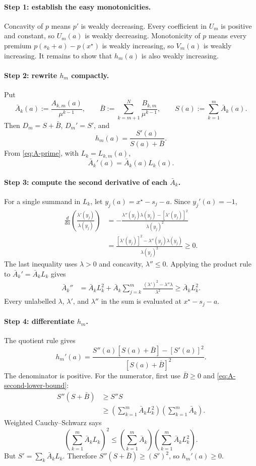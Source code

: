 \documentclass[11pt]{article}
\theoremstyle{tutorial}
\theoremstyle{remark}
\newcommand{\1}{\mathbb{I}}
\begin{document}
\paragraph{Step 1: establish the easy monotonicities.}
Concavity of $p$ means $p'$ is weakly decreasing.  Every coefficient in $U_m$ is positive and constant,
so $U_m(a)$ is weakly decreasing.  Monotonicity of $p$ means every premium
$p(s_k+a)-p(x^\star)$ is weakly increasing, so $V_m(a)$ is weakly increasing.  It remains to show that
$h_m(a)$ is also weakly increasing.

\paragraph{Step 2: rewrite $h_m$ compactly.}
Put
\[
\bar A_k(a):=\frac{A_{k,m}(a)}{\mu^{k-1}},
\qquad
\bar B:=\sum_{k=m+1}^N\frac{B_{k,m}}{\mu^{k-1}},
\qquad
S(a):=\sum_{k=1}^m\bar A_k(a).
\]
Then $D_m=S+\bar B$, $D_m'=S'$, and
\[
  h_m(a)=\frac{S'(a)}{S(a)+\bar B}.
\]
From \eqref{eq:A-prime}, with $L_k=L_{k,m}(a)$,
\[
  \bar A_k'(a)=\bar A_k(a)L_k(a).
\]

\paragraph{Step 3: compute the second derivative of each $\bar A_k$.}
For a single summand in $L_k$, let $y_j(a)=x^\star-s_j-a$.  Since $y_j'(a)=-1$,
\begin{align*}
\frac{d}{da}\left(\frac{\lambda'(y_j)}{\lambda(y_j)}\right)
&=-\frac{\lambda''(y_j)\lambda(y_j)-[\lambda'(y_j)]^2}{\lambda(y_j)^2}\\
&=\frac{[\lambda'(y_j)]^2-\lambda''(y_j)\lambda(y_j)}{\lambda(y_j)^2}\ge0.
\end{align*}
The last inequality uses $\lambda>0$ and concavity, $\lambda''\le0$.  Applying the product rule to
$\bar A_k'=\bar A_kL_k$ gives
\begin{align}
\bar A_k''
&=\bar A_kL_k^2
+\bar A_k\sum_{j=k}^m
\frac{(\lambda')^2-\lambda''\lambda}{\lambda^2}
\ge \bar A_kL_k^2.
\label{eq:A-second-lower-bound}
\end{align}
Every unlabelled $\lambda$, $\lambda'$, and $\lambda''$ in the sum is evaluated at
$x^\star-s_j-a$.

\paragraph{Step 4: differentiate $h_m$.}
The quotient rule gives
\[
h_m'(a)=
\frac{S''(a)[S(a)+\bar B]-[S'(a)]^2}{[S(a)+\bar B]^2}.
\]
The denominator is positive.  For the numerator, first use $\bar B\ge0$ and
\eqref{eq:A-second-lower-bound}:
\begin{align*}
S''(S+\bar B)
&\ge S''S\\
&\ge
\left(\sum_{k=1}^m\bar A_kL_k^2\right)
\left(\sum_{k=1}^m\bar A_k\right).
\end{align*}
Weighted Cauchy--Schwarz says
\[
\left(\sum_{k=1}^m\bar A_kL_k\right)^2
\le
\left(\sum_{k=1}^m\bar A_k\right)
\left(\sum_{k=1}^m\bar A_kL_k^2\right).
\]
But $S'=\sum_k\bar A_kL_k$.  Therefore $S''(S+\bar B)\ge(S')^2$, so $h_m'(a)\ge0$.
\end{document}

